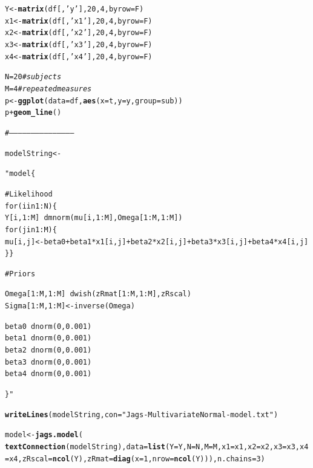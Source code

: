 \documentclass[11pt,a4paper,twoside]{book}\usepackage[]{graphicx}\usepackage[]{color}
\makeatletter
\newcommand{\hlnum}[1]{\textcolor[rgb]{0.686,0.059,0.569}{#1}}%
\newcommand{\hlstr}[1]{\textcolor[rgb]{0.192,0.494,0.8}{#1}}%
\newcommand{\hlcom}[1]{\textcolor[rgb]{0.678,0.584,0.686}{\textit{#1}}}%
\newcommand{\hlopt}[1]{\textcolor[rgb]{0,0,0}{#1}}%
\newcommand{\hlstd}[1]{\textcolor[rgb]{0.345,0.345,0.345}{#1}}%
\newcommand{\hlkwb}[1]{\textcolor[rgb]{0.69,0.353,0.396}{#1}}%
\newcommand{\hlkwc}[1]{\textcolor[rgb]{0.333,0.667,0.333}{#1}}%
\newcommand{\hlkwd}[1]{\textcolor[rgb]{0.737,0.353,0.396}{\textbf{#1}}}%
\newenvironment{kframe}{%
 \def\at@end@of@kframe{}%
 \ifinner\ifhmode%
  \def\at@end@of@kframe{\end{minipage}}%
  \begin{minipage}{\columnwidth}%
 \fi\fi%
 \def\FrameCommand##1{\hskip\@totalleftmargin \hskip-\fboxsep
 \colorbox{shadecolor}{##1}\hskip-\fboxsep
     \hskip-\linewidth \hskip-\@totalleftmargin \hskip\columnwidth}%
 \MakeFramed {\advance\hsize-\width
   \@totalleftmargin\z@ \linewidth\hsize
   \@setminipage}}%
 {\par\unskip\endMakeFramed%
 \at@end@of@kframe}
\newenvironment{knitrout}{}{} %
\makeatother
\begin{document}
\begin{knitrout}
\begin{kframe}
\begin{alltt}
\hlstd{Y} \hlkwb{<-} \hlkwd{matrix}\hlstd{(df[,}\hlstr{'y'}\hlstd{],} \hlnum{20}\hlstd{,} \hlnum{4}\hlstd{,} \hlkwc{byrow}\hlstd{=F)}
\hlstd{x1} \hlkwb{<-} \hlkwd{matrix}\hlstd{(df[,}\hlstr{'x1'}\hlstd{],} \hlnum{20}\hlstd{,} \hlnum{4}\hlstd{,} \hlkwc{byrow}\hlstd{=F)}
\hlstd{x2} \hlkwb{<-} \hlkwd{matrix}\hlstd{(df[,}\hlstr{'x2'}\hlstd{],} \hlnum{20}\hlstd{,} \hlnum{4}\hlstd{,} \hlkwc{byrow}\hlstd{=F)}
\hlstd{x3} \hlkwb{<-} \hlkwd{matrix}\hlstd{(df[,}\hlstr{'x3'}\hlstd{],} \hlnum{20}\hlstd{,} \hlnum{4}\hlstd{,} \hlkwc{byrow}\hlstd{=F)}
\hlstd{x4} \hlkwb{<-} \hlkwd{matrix}\hlstd{(df[,}\hlstr{'x4'}\hlstd{],} \hlnum{20}\hlstd{,} \hlnum{4}\hlstd{,} \hlkwc{byrow}\hlstd{=F)}

\hlstd{N} \hlkwb{=} \hlnum{20} \hlcom{#subjects}
\hlstd{M} \hlkwb{=} \hlnum{4} \hlcom{# repeated measures}
\hlstd{p} \hlkwb{<-} \hlkwd{ggplot}\hlstd{(}\hlkwc{data} \hlstd{= df,} \hlkwd{aes}\hlstd{(}\hlkwc{x} \hlstd{= t,} \hlkwc{y} \hlstd{= y,} \hlkwc{group} \hlstd{= sub))}
\hlstd{p} \hlopt{+} \hlkwd{geom_line}\hlstd{()}



\hlcom{#--------------------------------------------}

\hlstd{modelString} \hlkwb{<-} \hlstr{"model\{

# Likelihood
for(i in 1:N)\{
Y[i,1:M] ~ dmnorm(mu[i,1:M],Omega[1:M,1:M])
for(j in 1:M)\{
mu[i,j] <- beta0 + beta1*x1[i,j]+ beta2*x2[i,j]+ beta3*x3[i,j] + beta4*x4[i,j]  
\}\}

# Priors

Omega[1:M, 1:M] ~dwish(zRmat[1:M,1:M] , zRscal)
Sigma[1:M, 1:M] <- inverse(Omega)

beta0      ~ dnorm(0,0.001)
beta1      ~ dnorm(0,0.001)
beta2      ~ dnorm(0,0.001)
beta3      ~ dnorm(0,0.001)
beta4      ~ dnorm(0,0.001)

\}"}


\hlkwd{writeLines}\hlstd{( modelString ,} \hlkwc{con}\hlstd{=}\hlstr{"Jags-MultivariateNormal-model.txt"} \hlstd{)}

\hlstd{model} \hlkwb{<-} \hlkwd{jags.model}\hlstd{(}
        \hlkwd{textConnection}\hlstd{(modelString),} \hlkwc{data} \hlstd{=} \hlkwd{list}\hlstd{(}\hlkwc{Y}\hlstd{=Y,}\hlkwc{N}\hlstd{=N,}\hlkwc{M}\hlstd{=M,}\hlkwc{x1} \hlstd{= x1,} \hlkwc{x2} \hlstd{= x2,} \hlkwc{x3} \hlstd{= x3,} \hlkwc{x4} \hlstd{= x4,}\hlkwc{zRscal} \hlstd{=} \hlkwd{ncol}\hlstd{(Y) ,} \hlkwc{zRmat} \hlstd{=} \hlkwd{diag}\hlstd{(}\hlkwc{x}\hlstd{=}\hlnum{1}\hlstd{,}\hlkwc{nrow}\hlstd{=}\hlkwd{ncol}\hlstd{(Y)) ),} \hlkwc{n.chains}\hlstd{=}\hlnum{3}\hlstd{)}


\end{alltt}
\end{kframe}
\end{knitrout}
\end{document}
